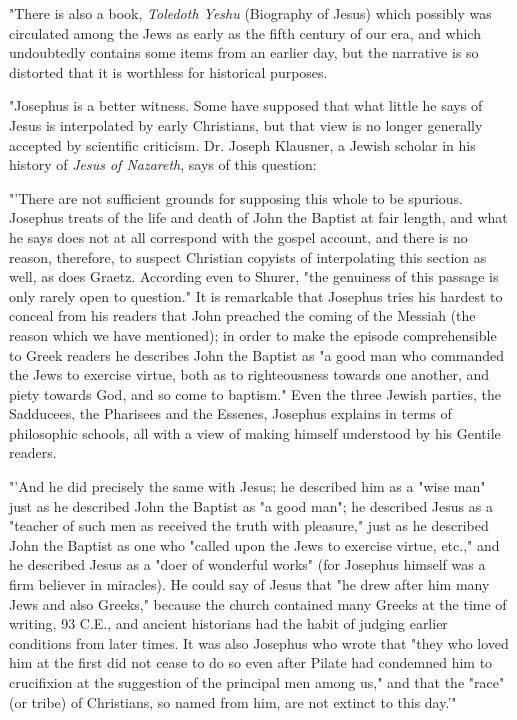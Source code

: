 "There is also a book, \textit{Toledoth Yeshu} (Biography of Jesus) which possibly was circulated
among the Jews as early as the fifth century of our era, and which undoubtedly contains some
items from an earlier day, but the narrative is so distorted that it is worthless for historical
purposes.

"Josephus is a better witness. Some have supposed that what little he says of Jesus is
interpolated by early Christians, but that view is no longer generally accepted by scientific
criticism. Dr. Joseph Klausner, a Jewish scholar in his history of \textit{Jesus of Nazareth}, says of
this question:

"'There are not sufficient grounds for supposing this whole to be spurious. Josephus treats of
the life and death of John the Baptist at fair length, and what he says does not at all
correspond with the gospel account, and there is no reason, therefore, to suspect Christian
copyists of interpolating this section as well, as does Graetz. According even to Shurer, "the
genuiness of this passage is only rarely open to question." It is remarkable that Josephus tries
his hardest to conceal from his readers that John preached the coming of the Messiah (the
reason which we have mentioned); in order to make the episode comprehensible to Greek
readers he describes John the Baptist as "a good man who commanded the Jews to exercise
virtue, both as to righteousness towards one another, and piety towards God, and so come to
baptism." Even the three Jewish parties, the Sadducees, the Pharisees and the Essenes,
Josephus explains in terms of philosophic schools, all with a view of making himself
understood by his Gentile readers.

"'And he did precisely the same with Jesus; he described him as a "wise man" just as he
described John the Baptist as "a good man"; he described Jesus as a "teacher of such men as
received the truth with pleasure," just as he described John the Baptist as one who "called
upon the Jews to exercise virtue, etc.," and he described Jesus as a "doer of wonderful works"
(for Josephus himself was a firm believer in miracles). He could say of Jesus that "he drew
after him many Jews and also Greeks," because the church contained many Greeks at the
time of writing, 93 C.E., and ancient historians had the habit of judging earlier conditions
from later times. It was also Josephus who wrote that "they who loved him at the first did not
cease to do so even after Pilate had condemned him to crucifixion at the suggestion of the
principal men among us," and that the "race" (or tribe) of Christians, so named from him, are
not extinct to this day.'"

